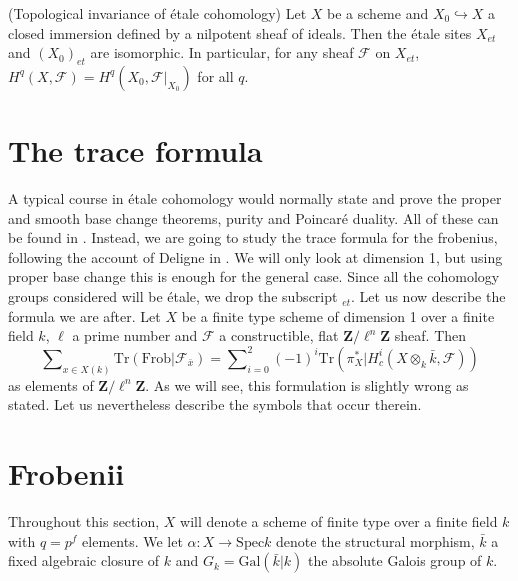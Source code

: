 \begin{proposition}
\label{proposition-topological-invariance}
(Topological invariance of \'etale cohomology)
Let $X$ be a scheme and $X_0\hookrightarrow X$ a closed immersion defined by a
nilpotent sheaf of ideals. Then the \'etale sites $X_{et}$ and $(X_0)_{et}$ are
isomorphic. In particular, for any sheaf $\mathcal{F}$ on $X_{et}$, $H^q(X,
\mathcal{F}) = H^q(X_0, \mathcal{F}|_{X_0})$ for all $q$.
\end{proposition}




\section{The trace formula}
\label{section-trace-formula}

\noindent
A typical course in \'etale cohomology would normally state and prove the
proper and smooth base change theorems, purity and Poincar\'e duality. All of
these can be found in \cite[Arcata]{SGA4.5}. Instead, we are going to study the
trace formula for the frobenius, following the account of Deligne in
\cite[Rapport]{SGA4.5}. We will only look at dimension 1, but using proper base
change this is enough for the general case. Since all the cohomology groups
considered will be \'etale, we drop the subscript $_{et}$. Let us now describe
the formula we are after. Let $X$ be a finite type scheme of dimension 1 over a
finite field $k$, $\ell$ a prime number and $\mathcal{F}$ a constructible, flat
$\mathbf{Z}/\ell^n\mathbf{Z}$ sheaf. Then
\begin{equation}
\label{equation-trace-formula-initial}
\sum\nolimits_{x \in X(k)}
\text{Tr}(\text{Frob} | \mathcal{F}_{\bar x}) =
\sum\nolimits_{i=0}^2
(-1)^i \text{Tr}(\pi_X^* | H^i_c(X\otimes_k \bar k, \mathcal{F}))
\end{equation}
as elements of $\mathbf{Z}/\ell^n\mathbf{Z}$. As we will see, this formulation
is slightly wrong as stated. Let us nevertheless describe the symbols that
occur therein.




\section{Frobenii}
\label{section-frobenii}

\noindent
Throughout this section, $X$ will denote a scheme of finite type over a finite
field $k$ with $q = p^f$ elements. We let $\alpha : X \to \text{Spec} k$ denote
the structural morphism, $\bar k$ a fixed algebraic closure of $k$ and $G_k =
\text{Gal}(\bar k | k)$ the absolute Galois group of $k$.


